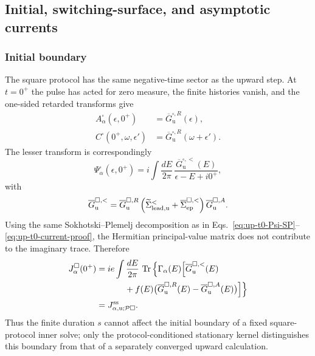 \documentclass[
 reprint,
 superscriptaddress,
 amsmath,amssymb,
 aps,prb,
 longbibliography,
 floatfix
]{revtex4-2}
\newcommand{\ep}{\mathrm{ep}}
\newcommand{\barSigma}{\overline{\Sigma}}
\begin{document}
\subsection{Initial, switching-surface, and asymptotic currents}
\label{sec:square-boundaries}

\subsubsection{Initial boundary}

The square protocol has the same negative-time sector as the upward step. At $t=0^+$ the pulse has acted for zero measure, the finite histories vanish, and the one-sided retarded transforms give
\begin{equation*}
\begin{aligned}
A_\alpha^\square(\epsilon,0^+)
&=
\overline G_{\mathrm u}^{\square,R}(\epsilon),
\\
C^\square(0^+,\omega,\epsilon')
&=
\overline G_{\mathrm u}^{\square,R}
(\omega+\epsilon').
\end{aligned}
\end{equation*}
The lesser transform is correspondingly
\begin{equation}
\Psi_\alpha^\square(\epsilon,0^+)
=
 i\int\frac{dE}{2\pi}\,
\frac{\overline G_{\mathrm u}^{\square,<}(E)}
{\epsilon-E+i0^+},
\label{eq:square-t0-Psi-proof}
\end{equation}
with
\begin{equation*}
\overline G_{\mathrm u}^{\square,<}
=
\overline G_{\mathrm u}^{\square,R}
\left(
\widetilde\Sigma_{\rm lead,u}^<
+
\barSigma_{\ep}^{\square,<}
\right)
\overline G_{\mathrm u}^{\square,A}.
\end{equation*}
Using the same Sokhotski--Plemelj decomposition as in Eqs.~\eqref{eq:up-t0-Psi-SP}--\eqref{eq:up-t0-current-proof}, the Hermitian principal-value matrix does not contribute to the imaginary trace. Therefore
\begin{equation}
\begin{aligned}
J_\alpha^\square(0^+)
={}&
 ie\int\frac{dE}{2\pi}\,
\operatorname{Tr}\Big\{
\Gamma_\alpha(E)
\Big[
\overline G_{\mathrm u}^{\square,<}(E)
\\
&\qquad+
f(E)
\big(
\overline G_{\mathrm u}^{\square,R}(E)
-
\overline G_{\mathrm u}^{\square,A}(E)
\big)
\Big]\Big\}
\\
={}&
J_{\alpha,\mathrm u;\mathcal P\square}^{\rm ss}.
\end{aligned}
\label{eq:square-t0-current-proof}
\end{equation}
Thus the finite duration $s$ cannot affect the initial boundary of a fixed square-protocol inner solve; only the protocol-conditioned stationary kernel distinguishes this boundary from that of a separately converged upward calculation.
\end{document}
